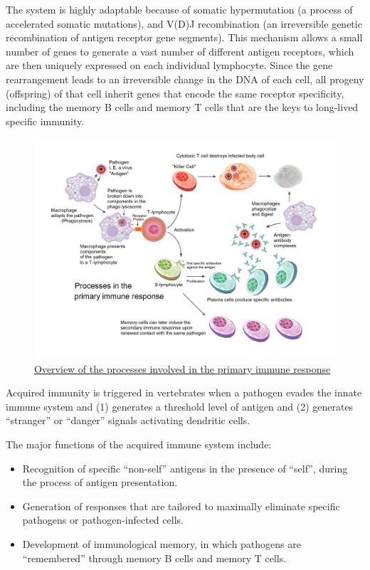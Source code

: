 The system is highly adaptable because of somatic hypermutation (a process of accelerated somatic mutations), and V(D)J recombination (an irreversible genetic recombination of antigen receptor gene segments). This mechanism allows a small number of genes to generate a vast number of different antigen receptors, which are then uniquely expressed on each individual lymphocyte. Since the gene rearrangement leads to an irreversible change in the DNA of each cell, all progeny (offspring) of that cell inherit genes that encode the same receptor specificity, including the memory B cells and memory T cells that are the keys to long-lived specific immunity.



\begin{figure}

{\centering \includegraphics[width=0.7\linewidth]{./figures/immune/Primary_immune_response_1} 

}

\caption{\href{https://commons.wikimedia.org/wiki/File:Primary_immune_response_1.png}{Overview of the processes involved in the primary immune response}}\label{fig:immuneoverview}
\end{figure}

Acquired immunity is triggered in vertebrates when a pathogen evades the innate immune system and (1) generates a threshold level of antigen and (2) generates ``stranger'' or ``danger'' signals activating dendritic cells.

The major functions of the acquired immune system include:

\begin{itemize}
\tightlist
\item
  Recognition of specific ``non-self'' antigens in the presence of ``self'', during the process of antigen presentation.
\item
  Generation of responses that are tailored to maximally eliminate specific pathogens or pathogen-infected cells.
\item
  Development of immunological memory, in which pathogens are ``remembered'' through memory B cells and memory T cells.
\end{itemize}

